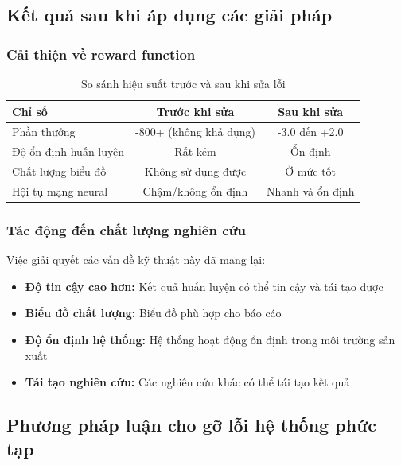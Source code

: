 \subsection{Kết quả sau khi áp dụng các giải pháp}

\subsubsection{Cải thiện về reward function}
\begin{table}[!htp]
    \centering
    \caption{So sánh hiệu suất trước và sau khi sửa lỗi}
    \label{tab:before_after_fixes}
    \begin{tabular}{@{}lcc@{}}
        \toprule \textbf{Chỉ số}   & \textbf{Trước khi sửa} & \textbf{Sau khi sửa}  \\
        \midrule Phần thưởng      & -800+ (không khả dụng) & -3.0 đến +2.0         \\
        Độ ổn định huấn luyện         & Rất kém                & Ổn định               \\
        Chất lượng biểu đồ               & Không sử dụng được     & Ở mức tốt   \\
        Hội tụ mạng neural & Chậm/không ổn định     & Nhanh và ổn định      \\
        \bottomrule
    \end{tabular}
\end{table}

\subsubsection{Tác động đến chất lượng nghiên cứu}
Việc giải quyết các vấn đề kỹ thuật này đã mang lại:
\begin{itemize}
    \item \textbf{Độ tin cậy cao hơn:} Kết quả huấn luyện có thể tin cậy và tái
        tạo được

    \item \textbf{Biểu đồ chất lượng:} Biểu đồ phù hợp cho báo cáo

    \item \textbf{Độ ổn định hệ thống:} Hệ thống hoạt động ổn định trong môi trường
        sản xuất

    \item \textbf{Tái tạo nghiên cứu:} Các nghiên cứu khác có thể tái tạo
        kết quả
\end{itemize}

\subsection{Phương pháp luận cho gỡ lỗi hệ thống phức tạp}

